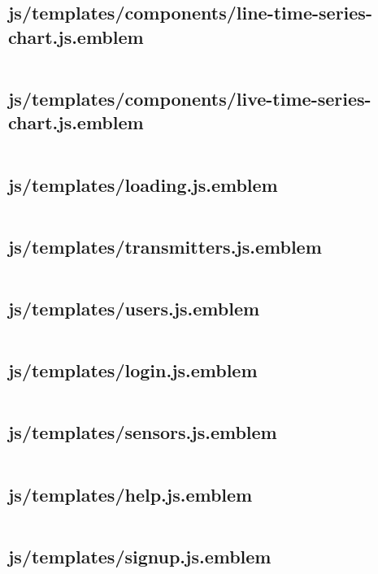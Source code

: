 \documentclass[letterpaper, 12 pt]{article}
\begin{document}
\subsection{js/templates/components/line-time-series-chart.js.emblem}
\inputminted{ruby}{../app/assets/javascripts/templates/components/line-time-series-chart.js.emblem}
\subsection{js/templates/components/live-time-series-chart.js.emblem}
\inputminted{ruby}{../app/assets/javascripts/templates/components/live-time-series-chart.js.emblem}
\subsection{js/templates/loading.js.emblem}
\inputminted{ruby}{../app/assets/javascripts/templates/loading.js.emblem}
\subsection{js/templates/transmitters.js.emblem}
\inputminted{ruby}{../app/assets/javascripts/templates/transmitters.js.emblem}
\subsection{js/templates/users.js.emblem}
\inputminted{ruby}{../app/assets/javascripts/templates/users.js.emblem}
\subsection{js/templates/login.js.emblem}
\inputminted{ruby}{../app/assets/javascripts/templates/login.js.emblem}
\subsection{js/templates/sensors.js.emblem}
\inputminted{ruby}{../app/assets/javascripts/templates/sensors.js.emblem}
\subsection{js/templates/help.js.emblem}
\inputminted{ruby}{../app/assets/javascripts/templates/help.js.emblem}
\subsection{js/templates/signup.js.emblem}
\inputminted{ruby}{../app/assets/javascripts/templates/signup.js.emblem}
\end{document}
